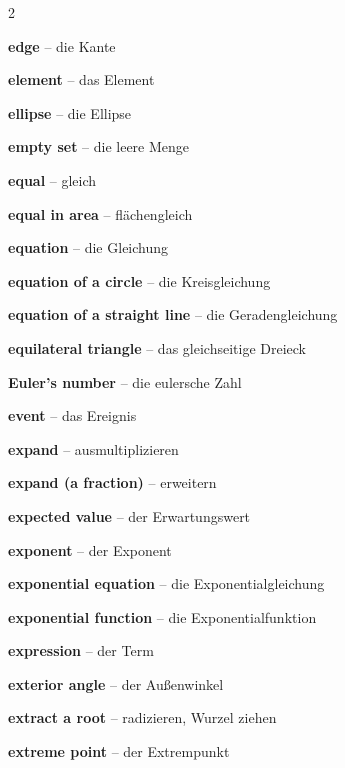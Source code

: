 \begin{multicols}{2}
\par\nopagebreak
\textbf{edge} -- die Kante\dotfill\hyperref[e:246]{\pageref*{e:246}}\par
\textbf{element} -- das Element\dotfill\hyperref[e:97]{\pageref*{e:97}}\par
\textbf{ellipse} -- die Ellipse\dotfill\hyperref[e:314]{\pageref*{e:314}}\par
\textbf{empty set} -- die leere Menge\dotfill\hyperref[e:104]{\pageref*{e:104}}\par
\textbf{equal} -- gleich\dotfill\hyperref[e:60]{\pageref*{e:60}}\par
\textbf{equal in area} -- flächengleich\dotfill\hyperref[e:195]{\pageref*{e:195}}\par
\textbf{equation} -- die Gleichung\dotfill\hyperref[e:76]{\pageref*{e:76}}\par
\textbf{equation of a circle} -- die Kreisgleichung\dotfill\hyperref[e:313]{\pageref*{e:313}}\par
\textbf{equation of a straight line} -- die Geradengleichung\dotfill\hyperref[e:309]{\pageref*{e:309}}\par
\textbf{equilateral triangle} -- das gleichseitige Dreieck\dotfill\hyperref[e:185]{\pageref*{e:185}}\par
\textbf{Euler's number} -- die eulersche Zahl\dotfill\hyperref[e:298]{\pageref*{e:298}}\par
\textbf{event} -- das Ereignis\dotfill\hyperref[e:328]{\pageref*{e:328}}\par
\textbf{expand} -- ausmultiplizieren\dotfill\hyperref[e:91]{\pageref*{e:91}}\par
\textbf{expand (a fraction)} -- erweitern\dotfill\hyperref[e:38]{\pageref*{e:38}}\par
\textbf{expected value} -- der Erwartungswert\dotfill\hyperref[e:335]{\pageref*{e:335}}\par
\textbf{exponent} -- der Exponent\dotfill\hyperref[e:44]{\pageref*{e:44}}\par
\textbf{exponential equation} -- die Exponentialgleichung\dotfill\hyperref[e:84]{\pageref*{e:84}}\par
\textbf{exponential function} -- die Exponentialfunktion\dotfill\hyperref[e:130]{\pageref*{e:130}}\par
\textbf{expression} -- der Term\dotfill\hyperref[e:72]{\pageref*{e:72}}\par
\textbf{exterior angle} -- der Außenwinkel\dotfill\hyperref[e:179]{\pageref*{e:179}}\par
\textbf{extract a root} -- radizieren, Wurzel ziehen\dotfill\hyperref[e:52]{\pageref*{e:52}}\par
\textbf{extreme point} -- der Extrempunkt\dotfill\hyperref[e:281]{\pageref*{e:281}}\par


\end{multicols}
